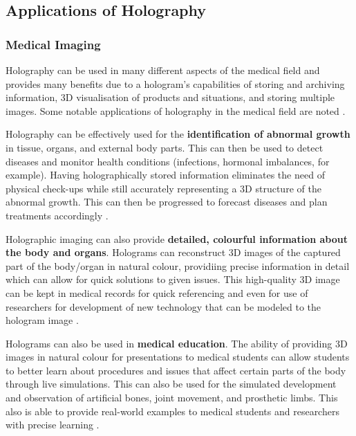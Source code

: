 \documentclass[12pt]{article}
\begin{document}
\vspace{1cm}

\subsection{Applications of Holography}

\subsubsection{Medical Imaging}

Holography can be used in many different aspects of the medical field and provides many benefits due to a hologram's capabilities of storing and archiving information, 3D visualisation of products and situations, and storing multiple images. Some notable applications of holography in the medical field are noted \cite{medholo}.

Holography can be effectively used for the \textbf{identification of abnormal growth} in tissue, organs, and external body parts. This can then be used to detect diseases and monitor health conditions (infections, hormonal imbalances, for example).
Having holographically stored information eliminates the need of physical check-ups while still accurately representing a 3D structure of the abnormal growth. This can then be progressed to forecast diseases and plan treatments accordingly \cite{medholo}.

Holographic imaging can also provide \textbf{detailed, colourful information about the body and organs}. Holograms can reconstruct 3D images of the captured part of the body/organ in natural colour, providiing precise information in detail which can allow for quick solutions to given issues.
This high-quality 3D image can be kept in medical records for quick referencing and even for use of researchers for development of new technology that can be modeled to the hologram image \cite{medholo}.

Holograms can also be used in \textbf{medical education}. The ability of providing 3D images in natural colour for presentations to medical students can allow students to better learn about procedures and issues that affect certain parts of the body through live simulations.
This can also be used for the simulated development and observation of artificial bones, joint movement, and prosthetic limbs. This also is able to provide real-world examples to medical students and researchers with precise learning \cite{medholo}.

\vspace{1cm}
\end{document}
